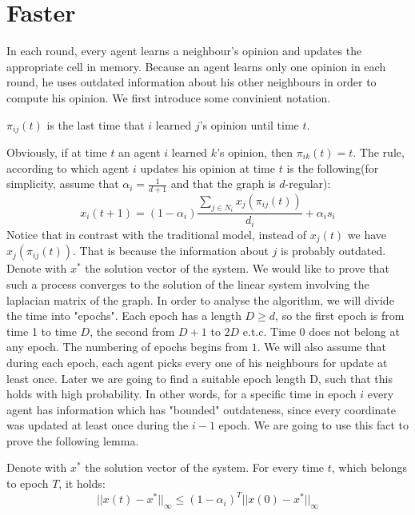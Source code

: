 \section{Faster}\label{app:s:cc_convergence}

In each round, every agent learns a neighbour's opinion and updates the appropriate cell in memory. Because an agent learns only one opinion in each round, he uses outdated information about his other neighbours in order to compute his opinion. We first introduce some convinient notation.
\begin{definition}
$\pi_{ij}(t)$ is the last time that $i$ learned $j$'s opinion until time $t$.
\end{definition}

Obviously, if at time $t$ an agent $i$ learned $k$'s opinion, then $\pi_{ik}(t) = t$. The rule, according to which agent $i$ updates his opinion at time $t$ is the following(for simplicity, assume that $\alpha_i = \frac{1}{d+1}$ and that the graph is $d$-regular):$$x_{i}(t+1)=(1-\alpha_i)\frac{\sum_{j \in N_i}x_j(\pi_{ij}(t))}{d_i}+\alpha_i s_i$$
Notice that in contrast with the traditional model, instead of $x_j(t)$ we have $x_j(\pi_{ij}(t))$. That is because the information about $j$ is probably outdated.
Denote with $x^*$ the solution vector of the system. We would like to prove that such a process converges to the solution of the linear system involving the laplacian matrix of the graph. In order to analyse the algorithm, we will divide the time into "epochs". Each epoch has a length $D \ge d$, so the first epoch is from time 1 to time $D$, the second from $D+1$ to $2D$ e.t.c. Time $0$ does not belong at any epoch. The numbering of epochs begins from $1$. We will also assume that during each epoch, each agent picks every one of his neighbours for update at least once. Later we are going to find a suitable epoch length D, such that this holds with high probability. In other words, for a specific time in epoch $i$ every agent has information which has "bounded" outdateness, since every coordinate was updated at least once during the $i-1$ epoch. We are going to use this fact to prove the following lemma.

\begin{lemma}
Denote with $x^*$ the solution vector of the system. For every time $t$, which belongs to epoch $T$, it holds:
$$ ||x(t)-x^*||_{\infty} \leq \left( 1-\alpha_i\right)^T||x(0)-x^*||_{\infty}$$
\end{lemma}

